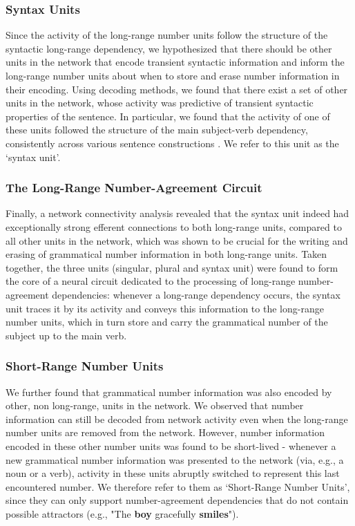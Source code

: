 \subsubsection{Syntax Units}
Since the activity of the long-range number units follow the structure of the syntactic long-range dependency, we hypothesized that there should be other units in the network that encode transient syntactic information and inform the long-range number units about when to store and erase number information in their encoding. 
Using decoding methods, we found that there exist a set of other units in the network, whose activity was predictive of transient syntactic properties of the sentence. 
In particular, we found that the activity of one of these units followed the structure of the main subject-verb dependency, consistently across various sentence constructions \citep[figure 3 in][]{lakretz2019emergence}. 
We refer to this unit as the `syntax unit'.

\subsubsection{The Long-Range Number-Agreement Circuit}
Finally, a network connectivity analysis revealed that the syntax unit indeed had exceptionally strong efferent connections to both long-range units, compared to all other units in the network, which was shown to be crucial for the writing and erasing of grammatical number information in both long-range units. Taken together, the three units (singular, plural and syntax unit) were found to form the core of a neural circuit dedicated to the processing of long-range number-agreement dependencies: whenever a long-range dependency occurs, the syntax unit traces it by its activity and conveys this information to the long-range number units, which in turn store and carry the grammatical number of the subject up to the main verb. 

\subsubsection{Short-Range Number Units}
We further found that grammatical number information was also encoded by other, non long-range, units in the network. We observed that number information can still be decoded from network activity even when the long-range number units are removed from the network. However, number information encoded in these other number units was found to be short-lived - whenever a new grammatical number information was presented to the network (via, e.g., a noun or a verb), activity in these units abruptly switched to represent this last encountered number. We therefore refer to them as `Short-Range Number Units', since they can only support number-agreement dependencies that do not contain possible attractors (e.g., "The \textbf{boy} gracefully \textbf{smiles}"). 

